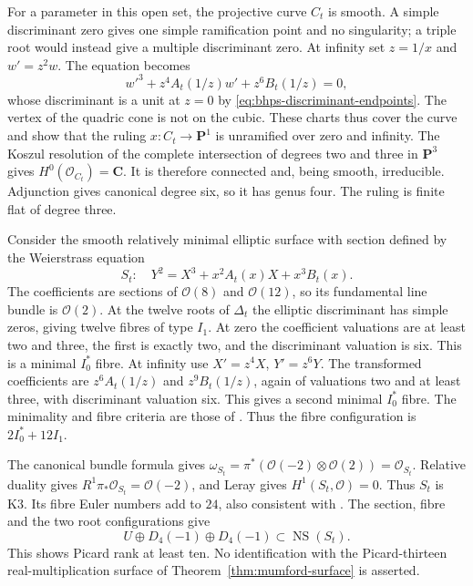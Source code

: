 \documentclass[11pt]{article}
\theoremstyle{definition}
\theoremstyle{remark}
\begin{document}
For a parameter in this open set, the projective curve $C_t$ is
smooth.  A simple discriminant zero gives one simple ramification
point and no singularity; a triple root would instead give a
multiple discriminant zero.  At infinity set $z=1/x$ and $w'=z^2w$.
The equation becomes
\[
 w'^3+z^4A_t(1/z)w'+z^6B_t(1/z)=0,
\]
whose discriminant is a unit at $z=0$ by
\eqref{eq:bhps-discriminant-endpoints}.
The vertex of the quadric cone is not on the cubic.
These charts thus cover the curve and show that the ruling
$x:C_t\to\mathbf P^1$ is unramified over zero and infinity.
The Koszul resolution of the complete intersection of degrees two
and three in $\mathbf P^3$ gives $H^0(\mathcal O_{C_t})=\mathbf C$.
It is therefore connected and, being smooth, irreducible.
Adjunction gives canonical degree six, so it has genus four.
The ruling is finite flat of degree three.

Consider the smooth relatively minimal elliptic surface with section
defined by the Weierstrass equation
\begin{equation}
 S_t:\quad Y^2=X^3+x^2A_t(x)X+x^3B_t(x).
 \label{eq:bhps-elliptic-k3}
\end{equation}
The coefficients are sections of $\mathcal O(8)$ and $\mathcal O(12)$,
so its fundamental line bundle is $\mathcal O(2)$.
At the twelve roots of $\Delta_t$ the elliptic discriminant has
simple zeros, giving twelve fibres of type $I_1$.
At zero the coefficient valuations are at least two and three,
the first is exactly two, and the discriminant valuation is six.
This is a minimal $I_0^*$ fibre.
At infinity use $X'=z^4X$, $Y'=z^6Y$.
The transformed coefficients are $z^6A_t(1/z)$ and $z^9B_t(1/z)$,
again of valuations two and at least three, with discriminant
valuation six.  This gives a second minimal $I_0^*$ fibre.
The minimality and fibre criteria are those of
\cite[\S4.5, Table~1]{SchuttShioda}.
Thus the fibre configuration is $2I_0^*+12I_1$.

The canonical bundle formula
\cite[Theorem~6.8]{SchuttShioda} gives
$\omega_{S_t}=\pi^*(\mathcal O(-2)\otimes\mathcal O(2))
 =\mathcal O_{S_t}$.
Relative duality gives $R^1\pi_*\mathcal O_{S_t}=\mathcal O(-2)$,
and Leray gives $H^1(S_t,\mathcal O)=0$.
Thus $S_t$ is K3.  Its fibre Euler numbers add to $24$, also
consistent with \cite[Corollary~6.11]{SchuttShioda}.
The section, fibre and the two root configurations give
\[
 U\oplus D_4(-1)\oplus D_4(-1)
                       \subset\operatorname{NS}(S_t).
\]
This shows Picard rank at least ten.  No identification with the
Picard-thirteen real-multiplication surface of
Theorem~\ref{thm:mumford-surface} is asserted.
\end{document}
